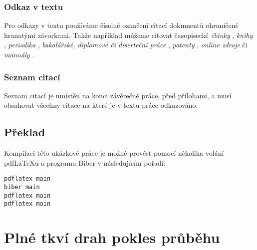 \documentclass[czech,bachelor,dept460,male,cpp,cpdeclaration]{diploma}
\begin{document}
\subsubsection{Odkaz v textu}
Pro odkazy v textu používáme číselné označení citací dokumentů ohraničené hranatými závorkami. Takže například můžeme citovat časopisecké \emph{články} \cite{herrmann, bertram, moore, yoon, sigfridsson, baez/article}, \emph{knihy} \cite{wilde, nietzsche:ksa1, averroes/bland, hammond, cotton, knuth:ct:a, gerhardt, gonzalez, companion}, \emph{periodika} \cite{jcg}, \emph{bakalářské, diplomové či diserteční práce} \cite{geer}, \emph{patenty} \cite{kowalik, almendro, sorace, laufenberg}, \emph{online zdroje} \cite{ctan, wassenberg, itzhaki, markey, baez/online} či \emph{manuály} \cite{cms}.

\subsubsection{Seznam citací}
Seznam citací je umístěn na konci závěrečné práce, před přílohami, a musí obsahovat všechny citace na které je v textu práce odkazováno.

\subsection{Překlad}
Kompilaci této ukázkové práce je možné provést pomocí několika volání pdf\LaTeX{}u a programu Biber v následujícím pořadí:
\begin{verbatim}
pdflatex main
biber main
pdflatex main
pdflatex main
\end{verbatim}

\printbibliography[title={Literatura}, heading=bibintoc]

\appendix
\section{Plné tkví drah pokles průběhu}
\end{document}
